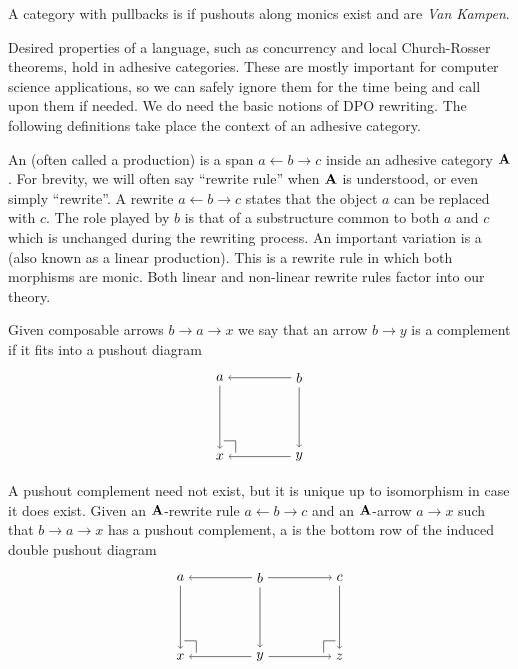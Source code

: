 \documentclass{amsart}
\begin{document}
\begin{df} \label{df:Adhesive}
	A category with pullbacks is  if pushouts along monics exist and are \emph{Van Kampen}.
\end{df} 

Desired properties of a language, such as concurrency and local Church-Rosser theorems, hold in adhesive categories.  These are mostly important for computer science applications, so we can safely ignore them for the time being and call upon them if needed.  We do need the basic notions of DPO rewriting.  The following definitions take place the context of an adhesive category.

An  (often called a production) is a span $ a \gets b \to c $ inside an adhesive category $ \mathbf{A} $.  For brevity, we will often say ``rewrite rule'' when $ \mathbf{A} $ is understood, or even simply ``rewrite''. A rewrite $ a \gets b \to c $ states that the object $ a $ can be replaced with $ c $.  The role played by $ b $ is that of a substructure common to both $ a $ and $ c $ which is unchanged during the rewriting process.  An important variation is a  (also known as a linear production).  This is a rewrite rule in which both morphisms are monic.  Both linear and non-linear rewrite rules factor into our theory.  

Given composable arrows $ b \to a \to x $ we say that an arrow $ b \to y $ is a  complement if it fits into a pushout diagram
\[
\begin{tikzpicture}
		\node (a) at (-1,1) {$ a $};
		\node (b) at (1,1) {$ b $};
		\node (x) at (-1,-1) {$ x $};
		\node (y) at (1,-1) {$ y $};
		\draw [->] (b) to (a);
		\draw [->] (a) to (x);
		\draw [->] (b) to (y);
		\draw [->] (y) to (x);
		\draw  (-0.6,-0.9) -- (-0.6,-0.6);
		\draw (-0.6,-0.6) -- (-0.9,-0.6);
\end{tikzpicture}
\]

A pushout complement need not exist, but it is unique up to isomorphism in case it does exist.  Given an $ \mathbf{A} $-rewrite rule $ a \gets b \to c $ and an $ \mathbf{A} $-arrow $a \to x$ such that $ b \to a \to x $ has a pushout complement, a  is the bottom row of the induced double pushout diagram
\[
\begin{tikzpicture}
	\node (a) at (-1,1) {$ a $};
	\node (b) at (1,1) {$ b $};
	\node (c) at (3,1) {$ c $};
	\node (x) at (-1,-1) {$ x $};
	\node (y) at (1,-1) {$ y $};
	\node (z) at (3,-1) {$ z $};
	\draw [->] (b) to (c);
	\draw [->] (b) to (a);
	\draw [->] (a) to (x);
	\draw [->] (b) to (y);
	\draw [->] (c) to (z);
	\draw [->] (y) to (x);
	\draw [->] (y) to (z);
	\draw  (-0.6,-0.9) -- (-0.6,-0.6);
	\draw (-0.6,-0.6) -- (-0.9,-0.6);
	\draw  (2.6,-0.6) -- (2.9,-0.6);
	\draw (2.6,-0.9) -- (2.6,-0.6);
\end{tikzpicture}
\]
\end{document}
